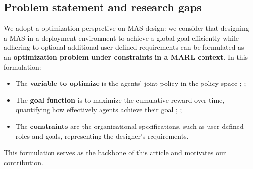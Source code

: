 \documentclass[pdflatex,sn-mathphys-num]{sn-jnl}%
\theoremstyle{thmstyleone}%
\theoremstyle{thmstyletwo}%
\theoremstyle{thmstylethree}%
\begin{document}

\subsection{Problem statement and research gaps}

We adopt a optimization perspective on MAS design: we consider that designing a MAS in a deployment environment to achieve a global goal efficiently while adhering to optional additional user-defined requirements can be formulated as an \textbf{optimization problem under constraints in a MARL context}. In this formulation:
\begin{itemize}
    \item The \textbf{variable to optimize} is the agents' joint policy in the policy space ; ;
    \item The \textbf{goal function} is to maximize the cumulative reward over time, quantifying how effectively agents achieve their goal ; ;
    \item The \textbf{constraints} are the organizational specifications, such as user-defined roles and goals, representing the designer's requirements.
\end{itemize}
This formulation serves as the backbone of this article and motivates our contribution. 
\end{document}
